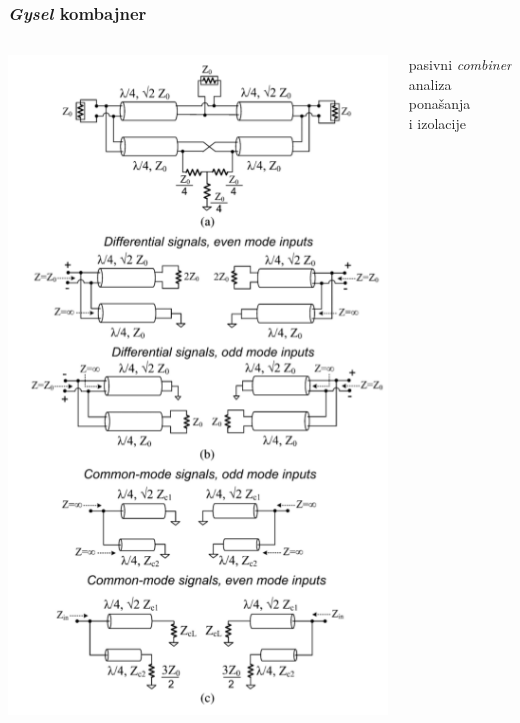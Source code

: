 \documentclass{beamer}
\begin{document}
\begin{frame}
  \frametitle{\textit{Gysel} kombajner}
  \begin{columns}
  \begin{column}{0.5\textwidth}
    \includegraphics[width=0.85\linewidth]{Gysel-power-combiner.png}
  \end{column}
  \begin{column}{0.5\textwidth}
    pasivni \textit{combiner} \\
    analiza ponašanja \\
    i izolacije
  \end{column}
  \end{columns}
\end{frame}
\end{document}

